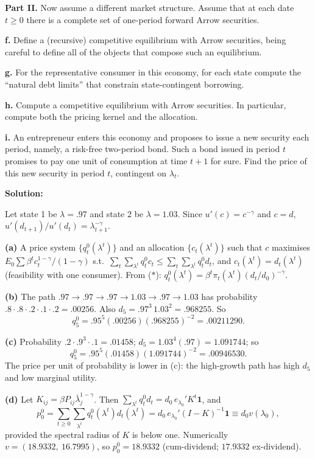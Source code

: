 \documentclass[12pt, letterpaper]{article}
\begin{document}
\begin{tcolorbox}[evenbox,title={Exercise 8.6 \quad Mehra--Prescott endowment, two market structures}]
\begin{tcolorbox}[questionbox]
\textbf{Part II.} Now assume a different market structure. Assume that at each date $t\ge0$ there is a
complete set of one-period forward Arrow securities.

\textbf{f.} Define a (recursive) competitive equilibrium with Arrow securities, being careful to define all
of the objects that compose such an equilibrium.

\textbf{g.} For the representative consumer in this economy, for each state compute the ``natural debt
limits'' that constrain state-contingent borrowing.

\textbf{h.} Compute a competitive equilibrium with Arrow securities. In particular, compute both the
pricing kernel and the allocation.

\textbf{i.} An entrepreneur enters this economy and proposes to issue a new security each period, namely,
a risk-free two-period bond. Such a bond issued in period $t$ promises to pay one unit of consumption at
time $t+1$ for sure. Find the price of this new security in period $t$, contingent on $\lambda_t$.
\end{tcolorbox}

\textbf{Solution:}

Let state 1 be $\lambda=.97$ and state 2 be $\lambda=1.03$. Since $u'(c)=c^{-\gamma}$ and $c=d$,
$u'(d_{t+1})/u'(d_t)=\lambda_{t+1}^{-\gamma}$.

\textbf{(a)} A price system $\{q^0_t(\lambda^t)\}$ and an allocation $\{c_t(\lambda^t)\}$ such that $c$ maximises
$E_0\sum\beta^tc_t^{1-\gamma}/(1-\gamma)$ s.t.\ $\sum_t\sum_{\lambda^t}q^0_tc_t\le\sum_t\sum_{\lambda^t}q^0_td_t$, and
$c_t(\lambda^t)=d_t(\lambda^t)$ (feasibility with one consumer). From ($\ast$):
$q^0_t(\lambda^t)=\beta^t\pi_t(\lambda^t)(d_t/d_0)^{-\gamma}$.

\textbf{(b)} The path $.97\to.97\to.97\to1.03\to.97\to1.03$ has probability $.8\cdot.8\cdot.2\cdot.1\cdot.2=.00256$.
Also $d_5=.97^3\,1.03^2=.968255$. So
\[
q^0_5=.95^5(.00256)(.968255)^{-2}=\mathbf{.00211290}.
\]

\textbf{(c)} Probability $.2\cdot.9^3\cdot.1=.01458$; $d_5=1.03^4(.97)=1.091744$; so
\[
q^0_5=.95^5(.01458)(1.091744)^{-2}=\mathbf{.00946530}.
\]
The price per unit of probability is lower in (c): the high-growth path has high $d_5$ and low marginal utility.

\textbf{(d)} Let $K_{ij}=\beta P_{ij}\bar\lambda_j^{1-\gamma}$. Then $\sum_{\lambda^t}q^0_td_t=d_0\,e_{\lambda_0}'K^t\mathbf 1$, and
\[
p^0_0=\sum_{t\ge0}\sum_{\lambda^t}q^0_t(\lambda^t)d_t(\lambda^t)=d_0\,e_{\lambda_0}'(I-K)^{-1}\mathbf 1\equiv d_0v(\lambda_0),
\]
provided the spectral radius of $K$ is below one. Numerically $v=(18.9332,\ 16.7995)$, so $p^0_0=18.9332$
(cum-dividend; $17.9332$ ex-dividend).


\end{tcolorbox}
\end{document}
